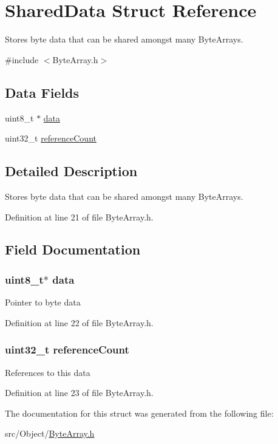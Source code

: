 \hypertarget{struct_shared_data}{
\section{SharedData Struct Reference}
\label{struct_shared_data}
}


Stores byte data that can be shared amongst many ByteArrays.  




{\ttfamily \#include $<$ByteArray.h$>$}

\subsection*{Data Fields}
\begin{DoxyCompactItemize}
\item 
uint8\_\-t $\ast$ \hyperlink{struct_shared_data_abe222f6d3581e7920dcad5306cc906a8}{data}
\item 
uint32\_\-t \hyperlink{struct_shared_data_ad83c3d5d3f46e6278a77cb80eb2a0705}{referenceCount}
\end{DoxyCompactItemize}


\subsection{Detailed Description}
Stores byte data that can be shared amongst many ByteArrays. 

Definition at line 21 of file ByteArray.h.



\subsection{Field Documentation}
\hypertarget{struct_shared_data_abe222f6d3581e7920dcad5306cc906a8}{
\subsubsection[{data}]{\setlength{\rightskip}{0pt plus 5cm}uint8\_\-t$\ast$ {\bf data}}}
\label{struct_shared_data_abe222f6d3581e7920dcad5306cc906a8}
Pointer to byte data 

Definition at line 22 of file ByteArray.h.

\hypertarget{struct_shared_data_ad83c3d5d3f46e6278a77cb80eb2a0705}{
\subsubsection[{referenceCount}]{\setlength{\rightskip}{0pt plus 5cm}uint32\_\-t {\bf referenceCount}}}
\label{struct_shared_data_ad83c3d5d3f46e6278a77cb80eb2a0705}
References to this data 

Definition at line 23 of file ByteArray.h.



The documentation for this struct was generated from the following file:\begin{DoxyCompactItemize}
\item 
src/Object/\hyperlink{_byte_array_8h}{ByteArray.h}\end{DoxyCompactItemize}
